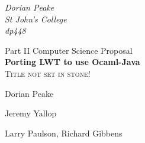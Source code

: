 \begin{titlepage}

\begin{flushright}
{\large \emph{Dorian Peake\\
      St John's College\\
      dp448}}
\end{flushright}

\vspace{3cm}

\begin{center}
{\LARGE Part II Computer Science Proposal}\\[1cm]
{\LARGE \bfseries Porting LWT to use Ocaml-Java}\\[0.5cm]
\textsc{Title not set in stone!}

\vspace{3cm}

\begin{description}
{\large
\item[Project Originator:]Dorian Peake\\[1cm]
\item[Project Supervisor:]Jeremy Yallop\\[1cm]
\item[Project Overseers:]Larry Paulson, Richard Gibbens\\[1cm]
}
\end{description}
\end{center}
\end{titlepage}

